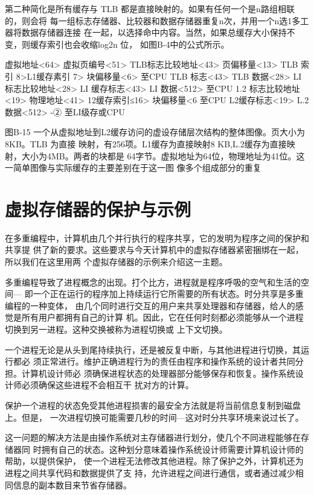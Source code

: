 第二种简化是所有缓存与 TLB 都是直接映射的。如果有任何一个是n路组相联的，则会将
每一组标志存储器、比较器和数据存储器重复n次，并用一个n选1多工器将数据存储器连接
在一起，以选择命中内容。当然，如果总缓存大小保持不变，则缓存索引也会收缩log2n 位，
如图B-4中的公式所示。

虚拟地址<64>
虚拟页编号<51>
TLB标志比较地址<43>
页偏移量<13>
TLB 索引 8>L1缓存素引 7>
块偏移量<6>
至CPU
TLB 标志<43>
TLB 数据<28>
LI 标志比较地址<28>
LI 缓存标志<43>
LI 数据<512>
至CPU
1.2 标志比较地址<19>
物理地址<41>
12缓存索引≤16>
块偏移量<6
至CPU
L2缓存标志<19>
L.2 数据<512>
-②
至LI级存或CPU

图B-15 一个从虚拟地址到L2缓存访问的虚设存储层次结构的整体图像。页大小为8KB。TLB 为直接
映射，有256项。L1缓存为直接映射8 KB,L.2缓存为直接映射，大小为4MB。两者的块都是
64字节。虚拟地址为64位，物理地址为41位。这一简单图像与实际缓存的主要差别在于这一图
像多个组成部分的重复

\section{虚拟存储器的保护与示例}

在多重编程中，计算机由几个并行执行的程序共享，它的发明为程序之间的保护和共享提
供了新的要求。这些要求与今天计算机中的虚拟存储器紧密捆绑在一起，所以我们在这里用两
个虚拟存储器的示例来介绍这一主题。

多重编程导致了进程概念的出现。打个比方，进程就是程序呼吸的空气和生活的空间—
即一个正在运行的程序加上持续运行它所需要的所有状态。时分共享是多重编程的一种变体，
由几个同时进行交互的用户来共享处理器和存储器，给人的感觉是所有用户都拥有自己的计算
机。因此，它在任何时刻都必须能够从一个进程切换到另一进程。这种交换被称为进程切换或
上下文切换。

一个进程无论是从头到尾持续执行，还是被反复中断，与其他进程进行切换，其运行都必
须正常进行。维护正确进程行为的责任由程序和操作系统的设计者共同分担。计算机设计师必
须确保进程状态的处理器部分能够保存和恢复。操作系统设计师必须确保这些进程不会相互干
扰对方的计算。

保护一个进程的状态免受其他进程损害的最安全方法就是将当前信息复制到磁盘上。但是，
一次进程切换可能需要几秒的时间—这对时分共享环境来说过长了。

这一问题的解决方法是由操作系统对主存储器进行划分，使几个不同进程能够在存储器同
时拥有自己的状态。这种划分意味着操作系统设计师需要计算机设计师的帮助，以提供保护，
使一个进程无法修改其他进程。除了保护之外，计算机还为进程之间共享代码和数据提供了支
持，允许进程之间进行通信，或者通过减少相同信息的副本数目来节省存储器。


